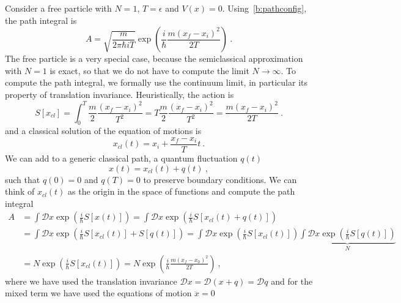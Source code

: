     \begin{example}
        Consider a free particle with $N = 1$, $T = \epsilon$ and $V(x) = 0$. Using~\eqref{b:pathconfig}, the path integral is 
        \begin{equation*}
            A = \sqrt{\frac{m}{2\pi\hbar i T}} \exp(\frac{i}{\hbar} \frac{m(x_f - x_i)^2}{2T}) ~.
        \end{equation*}
        The free particle is a very special case, because the semiclassical approximation with $N = 1$ is exact, so that we do not have to compute the limit $N \rightarrow \infty$. To compute the path integral, we formally use the continuum limit, in particular its property of translation invariance. Heuristically, the action is 
        \begin{equation*}
            S[x_{cl}] = \int_0^T \frac{m}{2} \frac{(x_f - x_i)^2}{T^2} = T \frac{m}{2} \frac{(x_f - x_i)^2}{T^2} =  \frac{m(x_f - x_i)^2}{2T} ~.
        \end{equation*}
        and a classical solution of the equation of motions is 
        \begin{equation*}
            x_{cl} (t) = x_i + \frac{x_f - x_i}{T} t ~.
        \end{equation*}
        We can add to a generic classical path, a quantum fluctuation $q(t)$
        \begin{equation*}
            x(t) = x_{cl}(t) + q(t) ~,
        \end{equation*}
        such that $q(0) = 0$ and $q(T) = 0$ to preserve boundary conditions. We can think of $x_{cl} (t)$ as the origin in the space of functions and compute the path integral
        \begin{equation*}
        \begin{aligned}
            A & = \int \mathcal D x \exp (\frac{i}{\hbar} S[x(t)]) = \int \mathcal D x \exp (\frac{i}{\hbar} S[x_{cl}(t) + q(t)]) \\ & = \int \mathcal D x \exp (\frac{i}{\hbar} S[x_{cl}(t)] + S [q(t)]) = \int \mathcal D x \exp (\frac{i}{\hbar} S[x_{cl}(t)]) \underbrace{\int \mathcal D x \exp (\frac{i}{\hbar} S [q(t)])}_N \\ & = N \exp(\frac{i}{\hbar} S[x_{cl}(t)]) = N \exp( \frac{i}{\hbar} \frac{m (x_f - x_0)^2 }{2 T} ) ~,
        \end{aligned}
        \end{equation*}
        where we have used the translation invariance $\mathcal D x = \mathcal D (x + q) = \mathcal D q$ and for the mixed term we have used the equations of motion $\ddot x = 0$ 

\end{example}
